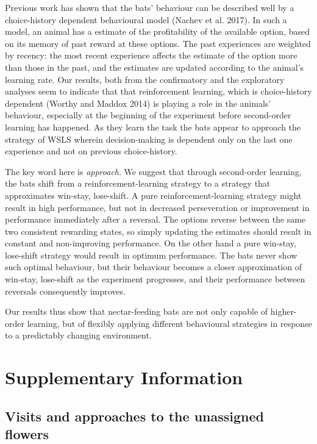 \documentclass[
]{article}
\begin{document}
Previous work has shown that the bats' behaviour can be described well by a choice-history dependent behavioural model (Nachev et al. 2017). In such a model, an animal has a estimate of the profitability of the available option, based on its memory of past reward at these options. The past experiences are weighted by recency: the most recent experience affects the estimate of the option more than those in the past, and the estimates are updated according to the animal's learning rate. Our results, both from the confirmatory and the exploratory analyses seem to indicate that that reinforcement learning, which is choice-history dependent (Worthy and Maddox 2014) is playing a role in the animals' behaviour, especially at the beginning of the experiment before second-order learning has happened. As they learn the task the bats appear to approach the strategy of WSLS wherein decision-making is dependent only on the last one experience and not on previous choice-history.

The key word here is \emph{approach}. We suggest that through second-order learning, the bats shift from a reinforcement-learning strategy to a strategy that approximates win-stay, lose-shift. A pure reinforcement-learning strategy might result in high performance, but not in decreased perseveration or improvement in performance immediately after a reversal. The options reverse between the same two consistent rewarding states, so simply updating the estimates should result in constant and non-improving performance. On the other hand a pure win-stay, lose-shift strategy would result in optimum performance. The bats never show such optimal behaviour, but their behaviour becomes a closer approximation of win-stay, lose-shift as the experiment progresses, and their performance between reversals consequently improves.

Our results thus show that nectar-feeding bats are not only capable of higher-order learning, but of flexibly applying different behavioural strategies in response to a predictably changing environment.

\hypertarget{supplementary-information}{%
\section{Supplementary Information}\label{supplementary-information}}

\hypertarget{visits-and-approaches-to-the-unassigned-flowers}{%
\subsection{Visits and approaches to the unassigned flowers}\label{visits-and-approaches-to-the-unassigned-flowers}}
\end{document}
